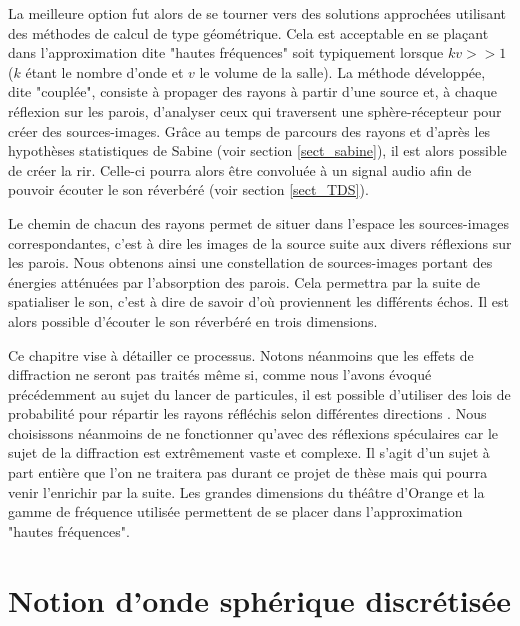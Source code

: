 La meilleure option fut alors de se tourner vers des solutions approchées utilisant des méthodes de calcul de type géométrique. Cela est acceptable en se plaçant dans l'approximation dite "hautes fréquences" soit typiquement lorsque $kv >> 1$ ($k$ étant le nombre d'onde et $v$ le volume de la salle). La méthode développée, dite "couplée", consiste à propager des rayons à partir d'une source et, à chaque réflexion sur les parois, d'analyser ceux qui traversent une sphère-récepteur pour créer des sources-images. Grâce au temps de parcours des rayons et d'après les hypothèses statistiques de Sabine (voir section \ref{sect_sabine}), il est alors possible de créer la \gls{rir}. Celle-ci pourra alors être convoluée à un signal audio afin de pouvoir écouter le son réverbéré (voir section \ref{sect_TDS}).

Le chemin de chacun des rayons permet de situer dans l'espace les sources-images correspondantes, c'est à dire les images de la source suite aux divers réflexions sur les parois. Nous obtenons ainsi une constellation de sources-images portant des énergies atténuées par l'absorption des parois. Cela permettra par la suite de spatialiser le son, c'est à dire de savoir d'où proviennent les différents échos. Il est alors possible d'écouter le son réverbéré en trois dimensions. 

Ce chapitre vise à détailler ce processus. Notons néanmoins que les effets de diffraction ne seront pas traités même si, comme nous l'avons évoqué précédemment au sujet du lancer de particules, il est possible d'utiliser des lois de probabilité pour répartir les rayons réfléchis selon différentes directions \cite[p.187-199]{diffusion}. Nous choisissons néanmoins de ne fonctionner qu'avec des réflexions spéculaires car le sujet de la diffraction est extrêmement vaste et complexe. Il s'agit d'un sujet à part entière que l'on ne traitera pas durant ce projet de thèse mais qui pourra venir l'enrichir par la suite. Les grandes dimensions du théâtre d'Orange et la gamme de fréquence utilisée permettent de se placer dans l'approximation "hautes fréquences".

\section{Notion d'onde sphérique discrétisée} \label{sect_discretise}

